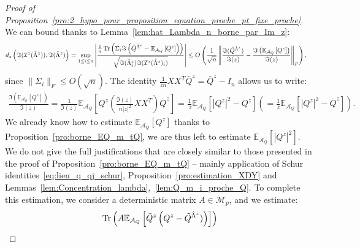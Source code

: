 \documentclass[a4papaer, titlepage]{book}
\begin{document}
\begin{proof}[Proof of Proposition~\ref{pro:2_hypo_pour_proposition_equation_proche_pt_fixe_proche}]
We can bound thanks to Lemma~\ref{lem:hat_Lambda_n_borne_par_Im_z}:
\begin{align*}
  d_s \left(\Im(\mathcal I^z(\hat \Lambda^z)) ,\Im(\hat \Lambda^z)\right)
  &=\sup_{1\leq i \leq n}\left\vert\frac{ \frac{1}{n}\operatorname{Tr} \left(\Sigma_i \Im \left(\tilde Q^{\hat \Lambda^z} - \mathbb E_{\mathcal A_Q} \left[ Q^z\right] \right)\right) }{\sqrt{\Im(\hat \Lambda^z_ i)\Im(\mathcal I^z(\hat \Lambda^z)_i)}}\right\vert 
  \leq O \left(\frac{1}{\sqrt n}\left\Vert\frac{ \Im (\tilde Q^{\hat \Lambda^z} ) }{\Im(z)} - \frac{ \Im \left(\mathbb E_{\mathcal A_Q} \left[ Q^z\right] \right) }{\Im(z)}\right\Vert_F\right),
\end{align*}
since $\|\Sigma_i\|_F \leq O(\sqrt n)$.
  The identity $\frac{1}{\bar zn}  XX^T \bar Q^z = \bar Q^z - I_n$ allows us to write:
  \begin{align}\label{eq:identite_IQ_Q}
     \frac{\Im(\mathbb E_{\mathcal A_Q}[Q^z])}{\Im(z)}
    = \frac{1}{\Im(z)} \mathbb E_{\mathcal A_Q} \left[ Q^z\left( \frac{\Im(z)}{n|z|^2} XX^T \right)\bar Q^z \right]
    = \frac{1}{\ z}\mathbb E_{\mathcal A_Q}[|Q^z|^2 -  Q^z] (= \frac{1}{  \bar z}\mathbb E_{\mathcal A_Q}[|Q^z|^2 -   \bar Q^z]).
   \end{align} 
  We already know how to estimate $\mathbb E_{\mathcal A_Q}[ Q^z]$ thanks to Proposition~\ref{pro:borne_EQ_m_tQ}, we are thus left to estimate $\mathbb E_{\mathcal A_Q}[|Q^z|^2] $. We do not give the full justifications that are closely similar to those presented in the proof of Proposition~\ref{pro:borne_EQ_m_tQ} -- mainly application of Schur identities~\eqref{eq:lien_q_qj_schur}, Proposition~\ref{pro:estimation_XDY} and Lemmas~\ref{lem:Concentration_lambda},~\ref{lem:Q_m_i_proche_Q}. To complete this estimation, we consider a deterministic matrix $A\in \mathcal M_{p}$, and we estimate:
  \begin{align*} 
    &\tr \left(A \mathbb E_{\mathcal A_Q} \left[\bar Q^z\left(Q^z - \tilde Q^{\hat\Lambda^z})\right)\right]\right)\\

\end{align*}
\end{proof}
\end{document}
